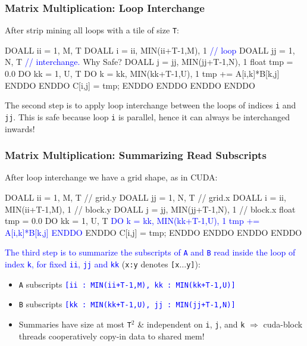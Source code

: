 \documentclass{beamer}
\newcommand{\blue}[1]{\textcolor{Blue}{{#1}}}
\renewcommand{\emph}[1]{\textcolor{structure}{#1}}
\newcommand{\emp}[1]{\textcolor{DikuRed}{ #1}}
\begin{document}
\begin{frame}[fragile,t]
  \frametitle{Matrix Multiplication: Loop Interchange} %

After strip mining all loops with a tile of size {\tt T}:
\begin{colorcode}[fontsize=\scriptsize]
\emp{DOALL ii = 1, M, T}
  \emph{DOALL i = ii, MIN(ii+T-1,M), 1}     \blue{// loop}
    \emp{DOALL jj = 1, N, T}               \blue{// interchange.} \alert{Why Safe?}
      \emph{DOALL j = jj, MIN(jj+T-1,N), 1}
        float tmp = 0.0
        DO kk = 1, U, T
          DO k = kk, MIN(kk+T-1,U), 1
            tmp += A[i,k]*B[k,j]
        ENDDO ENDDO
        C[i,j] = tmp;
ENDDO ENDDO ENDDO ENDDO
\end{colorcode}
\medskip
\pause

The second step is to apply loop interchange between the loops 
of indices {\tt i} and {\tt jj}. This is safe because loop {\tt i}
is parallel, hence it can always be interchanged inwards!

\end{frame}

\begin{frame}[fragile,t]
  \frametitle{Matrix Multiplication: Summarizing Read Subscripts} %

After loop interchange we have a grid shape, as in CUDA:
\begin{colorcode}[fontsize=\scriptsize]
\emp{DOALL ii = 1, M, T}                    // \emp{grid.y}
  \emp{DOALL jj = 1, N, T}                  // \emp{grid.x}
    \emph{DOALL i = ii, MIN(ii+T-1,M), 1}    // \emph{block.y}
      \emph{DOALL j = jj, MIN(jj+T-1,N), 1}  // \emph{block.x}
        float tmp = 0.0
        DO kk = 1, U, T
          \blue{DO k = kk, MIN(kk+T-1,U), 1}
            \blue{tmp += A[i,k]*B[k,j]}
          \blue{ENDDO} 
        ENDDO
        C[i,j] = tmp;
ENDDO ENDDO ENDDO ENDDO
\end{colorcode}
\medskip

\blue{The third step is to summarize the subscripts of {\tt A} and {\tt B}
read inside the loop of index {\tt k}, for fixed {\tt ii}, {\tt jj} and {\tt kk}}
({\tt x:y} denotes {\tt [x$\ldots$y]}):\pause
\begin{itemize}
    \item {\tt A} subscripts \blue{\tt[ii~:~MIN(ii+T-1,M), kk~:~MIN(kk+T-1,U)]}
    \item {\tt B} subscripts \blue{\tt[kk~:~MIN(kk+T-1,U), jj~:~MIN(jj+T-1,N)]}
    \item Summaries have size at most {\tt T$^2$} \& independent on {\tt i}, 
            {\tt j}, and {\tt k} $\Rightarrow$ {\sc cuda}-block threads 
            cooperatively copy-in data to shared mem!   
\end  {itemize}

\end{frame}
\end{document}
